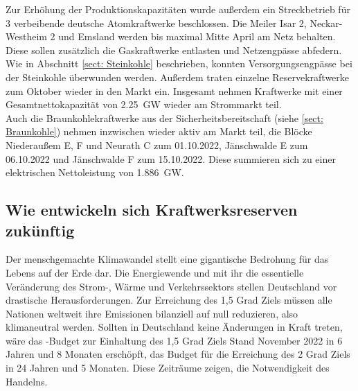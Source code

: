 		Zur Erhöhung der Produktionskapazitäten wurde außerdem ein Streckbetrieb für 3 verbeibende deutsche Atomkraftwerke beschlossen. Die Meiler Isar 2, Neckar-Westheim 2 und Emsland werden bis maximal Mitte April am Netz behalten. Diese sollen zusätzlich die Gaskraftwerke entlasten und Netzengpässe abfedern.\\
		Wie in Abschnitt \ref{sect: Steinkohle} beschrieben, konnten Versorgungsengpässe bei der Steinkohle überwunden werden. Außerdem traten einzelne Reservekraftwerke zum Oktober wieder in den Markt ein. Insgesamt nehmen Kraftwerke mit einer Gesamtnettokapazität von \SI{2,25}{\giga \watt} wieder am Strommarkt teil.\\
		Auch die Braunkohlekraftwerke aus der Sicherheitsbereitschaft (siehe \ref{sect: Braunkohle}) nehmen inzwischen wieder aktiv am Markt teil, die Blöcke Niederaußem E, F und Neurath C zum 01.10.2022, Jänschwalde E zum 06.10.2022 und Jänschwalde F zum 15.10.2022. Diese summieren sich zu einer elektrischen Nettoleistung von \SI{1,886}{\giga \watt}.\\
		
		
	\subsection{Wie entwickeln sich Kraftwerksreserven zukünftig}	
	Der menschgemachte Klimawandel stellt eine gigantische Bedrohung für das Lebens auf der Erde dar. Die Energiewende und mit ihr die essentielle Veränderung des Strom-, Wärme und Verkehrssektors stellen Deutschland vor drastische Herausforderungen. Zur Erreichung des 1,5 Grad Ziels müssen alle Nationen weltweit ihre Emissionen bilanziell auf null reduzieren, also klimaneutral werden. Sollten in Deutschland keine Änderungen in Kraft treten, wäre das \SI{}{\COtwo}-Budget zur Einhaltung des 1,5 Grad Ziels Stand November 2022 in 6 Jahren und 8 Monaten erschöpft, das Budget für die Erreichung des 2 Grad Ziels in 24 Jahren und 5 Monaten. Diese Zeiträume zeigen, die Notwendigkeit des Handelns.  \\
	
